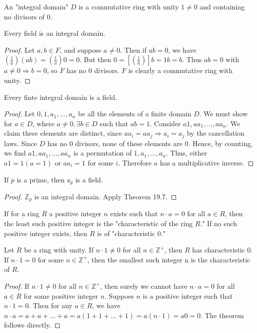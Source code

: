 \documentclass[a4paper,8pt]{article}
\begin{document}
\begin{outline}
    An "integral domain" \(D\) is a commutative ring with unity \(1 \neq 0\) and containing no divisors of \(0\).

    Every field is an integral domain.

    \begin{proof}
      Let \(a, b \in F\), and suppose \(a \neq 0\). Then if \(ab = 0\), we have \((\frac{1}{a})(ab) = (\frac{1}{a})0 = 0\).
      But then \(0 = [(\frac{1}{a})]b = 1b = b\). Thus \(ab = 0\) with \(a \neq 0 \Rightarrow b = 0\), so \(F\) has no \(0\)
      divisors. \(F\) is clearly a commutative ring with unity.
    \end{proof}

    Every finte integral domain is a field.

    \begin{proof}
      Let \(0, 1, a_1, \ldots, a_n\) be all the elements of a finite domain \(D\). We must show for \(a \in D\), where
      \(a \neq 0, \exists b \in D\) such that \(ab = 1\). Consider \(a1, aa_1, \ldots, aa_n\). We claim these elements
      are distinct, since \(aa_i = aa_j \Rightarrow a_i = a_j\) by the cancellation laws. Since \(D\) has no \(0\)
      divisors, none of these elements are \(0\). Hence, by counting, we find \(a1, aa_1, \ldots, aa_n\) is a permutation
      of \(1, a_1, \ldots, a_n\). Thus, either \(a1 = 1 (a = 1)\) or \(aa_i = 1\) for some \(i\). Therefore \(a\) has a
      multiplicative inverse.
    \end{proof}

    If \(p\) is a prime, then \(\mathbb{x}_p\) is a field.

    \begin{proof}
      \(\mathbb{Z}_p\) is an integral domain. Apply Theorem 19.7.
    \end{proof}

    If for a ring \(R\) a positive integer \(n\) exists such that \(n \cdot a = 0\) for all \(a \in R\),
    then the least such positive integer is the "characteristic of the ring \(R\)." If no such positive integer
    exists, then \(R\) is of "characteristic 0."

    Let \(R\) be a ring with unity. If \(n \cdot 1 \neq 0\) for all \(n \in \mathbb{Z}^{+}\), then
    \(R\) has characteristic \(0\). If \(n \cdot 1 = 0\) for some \(n \in \mathbb{Z}^{+}\), then the smallest
    such integer n is the characteristic of \(R\).

    \begin{proof}
      If \(n \cdot 1 \neq 0\) for all \(n \in \mathbb{Z}^{+}\), then surely we cannot have \(n \cdot a = 0\) for all
      \(a \in R\) for some positive integer \(n\). Suppoes \(n\) is a positive integer such that \(n \cdot 1 = 0\). Then
      for any \(a \in R\), we have \(n \cdot a = a + a + \ldots + a = a(1 + 1 + \ldots + 1) = a(n \cdot 1) = a0 = 0\).
      The theorem follows directly.
    \end{proof}

\end{outline}
\end{document}
